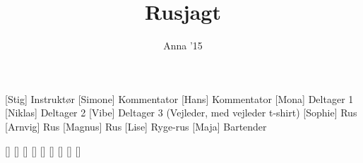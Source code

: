 \documentclass[a4paper,11pt]{article}
\title{Rusjagt}
\author{Anna '15}
\begin{document}
\maketitle

\begin{roles}
[Stig] Instruktør
[Simone] Kommentator
[Hans] Kommentator
[Mona] Deltager 1
[Niklas] Deltager 2
[Vibe] Deltager 3 (Vejleder, med vejleder t-shirt)
[Sophie] Rus
[Arnvig] Rus
[Magnus] Rus
[Lise] Ryge-rus
[Maja] Bartender
\end{roles}

\begin{props}
[]
[]
[]
[]
[]
[]
[]
[]
[]
\end{props}
\end{document}

